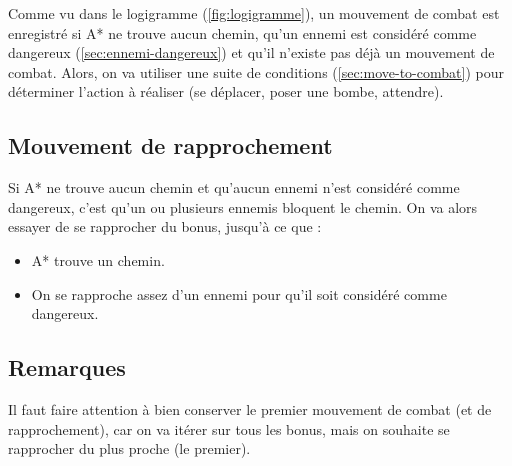 Comme vu dans le logigramme (\autoref{fig:logigramme}), un mouvement de combat est enregistré si A* ne trouve aucun chemin, qu'un ennemi est considéré comme dangereux (\autoref{sec:ennemi-dangereux}) et qu'il n'existe pas déjà un mouvement de combat.
Alors, on va utiliser une suite de conditions (\autoref{sec:move-to-combat}) pour déterminer l'action à réaliser (se déplacer, poser une bombe, attendre).

\subsection{Mouvement de rapprochement}

Si A* ne trouve aucun chemin et qu'aucun ennemi n'est considéré comme dangereux, c'est qu'un ou plusieurs ennemis bloquent le chemin.
On va alors essayer de se rapprocher du bonus, jusqu'à ce que : 
\begin{itemize}
    \item A* trouve un chemin.
    \item On se rapproche assez d'un ennemi pour qu'il soit considéré comme dangereux.
\end{itemize}

\subsection{Remarques}

Il faut faire attention à bien conserver le premier mouvement de combat (et de rapprochement), car on va itérer sur tous les bonus, mais on souhaite se rapprocher du plus proche (le premier). 
